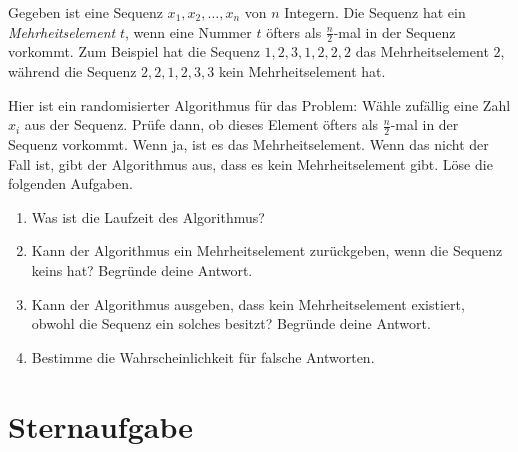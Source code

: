 \documentclass{uebung_cs}
\begin{document}
\begin{aufgabe}[Mehrheit]
	Gegeben ist eine Sequenz $x_1,x_2,\dots,x_n$ von $n$ Integern. Die Sequenz hat ein \textit{Mehrheitselement} $t$, wenn eine Nummer $t$ öfters als $\frac{n}{2}$-mal in der Sequenz vorkommt. Zum Beispiel hat die Sequenz $1,2,3,1,2,2,2$ das Mehrheitselement $2$, während die Sequenz $2,2,1,2,3,3$ kein Mehrheitselement hat.
	
	Hier ist ein randomisierter Algorithmus für das Problem: Wähle zufällig eine Zahl $x_i$ aus der Sequenz. Prüfe dann, ob dieses Element öfters als $\frac{n}{2}$-mal in der Sequenz vorkommt. Wenn ja, ist es das Mehrheitselement. Wenn das nicht der Fall ist, gibt der Algorithmus aus, dass es kein Mehrheitselement gibt. Löse die folgenden Aufgaben.
	\begin{enumerate}
		\item Was ist die Laufzeit des Algorithmus? \\
		\item Kann der Algorithmus ein Mehrheitselement zurückgeben, wenn die Sequenz keins hat? Begründe deine Antwort. \\
		\item Kann der Algorithmus ausgeben, dass kein Mehrheitselement existiert, obwohl die Sequenz ein solches besitzt? Begründe deine Antwort. \\
		\item Bestimme die Wahrscheinlichkeit für falsche Antworten.
	\end{enumerate}
\end{aufgabe}

\section*{Sternaufgabe}
\end{document}
